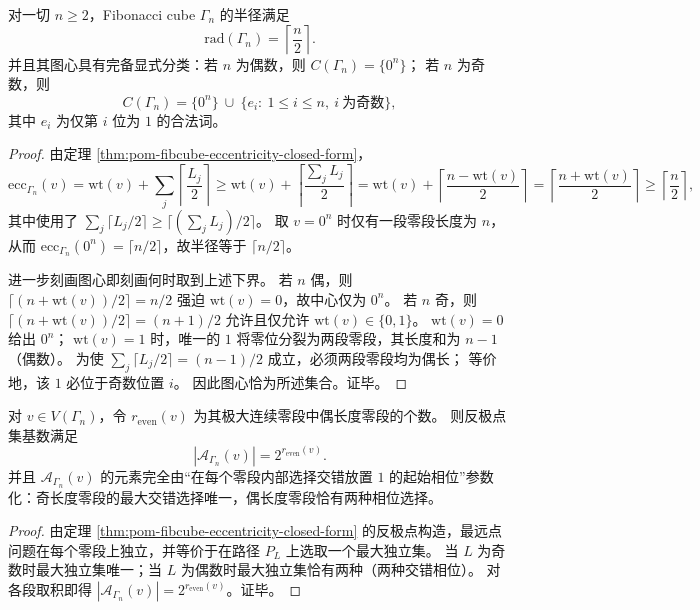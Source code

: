 \begin{corollary}\label{cor:pom-fibcube-radius-center-classification}
对一切 \(n\ge 2\)，Fibonacci cube \(\Gamma_n\) 的半径满足
\[
\mathrm{rad}(\Gamma_n)=\left\lceil\frac{n}{2}\right\rceil.
\]
并且其图心具有完备显式分类：若 \(n\) 为偶数，则 \(C(\Gamma_n)=\{0^n\}\)；
若 \(n\) 为奇数，则
\[
C(\Gamma_n)=\{0^n\}\ \cup\ \{e_i:\ 1\le i\le n,\ i\ \text{为奇数}\},
\]
其中 \(e_i\) 为仅第 \(i\) 位为 \(1\) 的合法词。
\end{corollary}
\begin{proof}
由定理 \ref{thm:pom-fibcube-eccentricity-closed-form}，
\[
\mathrm{ecc}_{\Gamma_n}(v)=\mathrm{wt}(v)+\sum_{j}\left\lceil\frac{L_j}{2}\right\rceil
\ge \mathrm{wt}(v)+\left\lceil\frac{\sum_j L_j}{2}\right\rceil
=\mathrm{wt}(v)+\left\lceil\frac{n-\mathrm{wt}(v)}{2}\right\rceil
=\left\lceil\frac{n+\mathrm{wt}(v)}{2}\right\rceil
\ge \left\lceil\frac{n}{2}\right\rceil,
\]
其中使用了 \(\sum_j\lceil L_j/2\rceil\ge \lceil(\sum_j L_j)/2\rceil\)。
取 \(v=0^n\) 时仅有一段零段长度为 \(n\)，从而 \(\mathrm{ecc}_{\Gamma_n}(0^n)=\lceil n/2\rceil\)，故半径等于 \(\lceil n/2\rceil\)。
\par
进一步刻画图心即刻画何时取到上述下界。
若 \(n\) 偶，则 \(\lceil(n+\mathrm{wt}(v))/2\rceil=n/2\) 强迫 \(\mathrm{wt}(v)=0\)，故中心仅为 \(0^n\)。
若 \(n\) 奇，则 \(\lceil(n+\mathrm{wt}(v))/2\rceil=(n+1)/2\) 允许且仅允许 \(\mathrm{wt}(v)\in\{0,1\}\)。
\(\mathrm{wt}(v)=0\) 给出 \(0^n\)；
\(\mathrm{wt}(v)=1\) 时，唯一的 \(1\) 将零位分裂为两段零段，其长度和为 \(n-1\)（偶数）。
为使 \(\sum_j\lceil L_j/2\rceil=(n-1)/2\) 成立，必须两段零段均为偶长；
等价地，该 \(1\) 必位于奇数位置 \(i\)。
因此图心恰为所述集合。证毕。
\end{proof}

\begin{proposition}[反极点集的相位计数与偶段指数]\label{prop:pom-fibcube-antipode-count}
对 \(v\in V(\Gamma_n)\)，令 \(r_{\mathrm{even}}(v)\) 为其极大连续零段中偶长度零段的个数。
则反极点集基数满足
\[
|\mathcal{A}_{\Gamma_n}(v)|=2^{r_{\mathrm{even}}(v)}.
\]
并且 \(\mathcal{A}_{\Gamma_n}(v)\) 的元素完全由“在每个零段内部选择交错放置 \(1\) 的起始相位”参数化：奇长度零段的最大交错选择唯一，偶长度零段恰有两种相位选择。
\end{proposition}
\begin{proof}
由定理 \ref{thm:pom-fibcube-eccentricity-closed-form} 的反极点构造，最远点问题在每个零段上独立，并等价于在路径 \(P_{L}\) 上选取一个最大独立集。
当 \(L\) 为奇数时最大独立集唯一；当 \(L\) 为偶数时最大独立集恰有两种（两种交错相位）。
对各段取积即得 \(|\mathcal{A}_{\Gamma_n}(v)|=2^{r_{\mathrm{even}}(v)}\)。证毕。
\end{proof}

